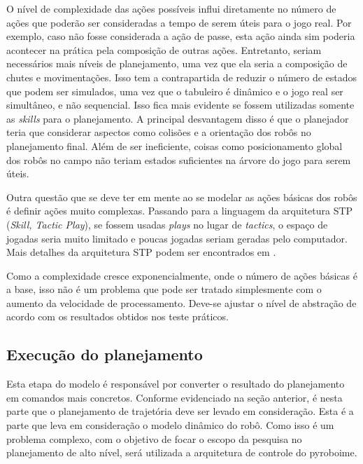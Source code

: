 O nível de complexidade das ações possíveis influi diretamente no número de
ações que poderão ser consideradas a tempo de serem úteis para o jogo real.  Por
exemplo, caso não fosse considerada a ação de passe, esta ação ainda sim poderia
acontecer na prática pela composição de outras ações.  Entretanto, seriam
necessários mais níveis de planejamento, uma vez que ela seria a composição de
chutes e movimentações.  Isso tem a contrapartida de reduzir o número de estados
que podem ser simulados, uma vez que o tabuleiro é dinâmico e o jogo real ser
simultâneo, e não sequencial.  Isso fica mais evidente se fossem utilizadas
somente as \textit{skills} para o planejamento.  A principal desvantagem disso é
que o planejador teria que considerar aspectos como colisões e a orientação dos
robôs no planejamento final.  Além de ser ineficiente, coisas como
posicionamento global dos robôs no campo não teriam estados suficientes na
árvore do jogo para serem úteis.

Outra questão que se deve ter em mente ao se modelar as ações básicas dos robôs
é definir ações muito complexas.  Passando para a linguagem da arquitetura STP
(\textit{Skill, Tactic Play}), se fossem usadas \textit{plays} no lugar de
\textit{tactics}, o espaço de jogadas seria muito limitado e poucas jogadas
seriam geradas pelo computador.  Mais detalhes da arquitetura STP podem ser
encontrados em \cite{browning2004stp}.

Como a complexidade cresce exponencialmente, onde o número de ações básicas é a
base, isso não é um problema que pode ser tratado simplesmente com o aumento da
velocidade de processamento.  Deve-se ajustar o nível de abstração de acordo com
os resultados obtidos nos teste práticos.

\subsection{Execução do planejamento}

Esta etapa do modelo é responsável por converter o resultado do planejamento em
comandos mais concretos.  Conforme evidenciado na seção anterior, é nesta parte
que o planejamento de trajetória deve ser levado em consideração.  Esta é a
parte que leva em consideração o modelo dinâmico do robô.  Como isso é um
problema complexo, com o objetivo de focar o escopo da pesquisa no planejamento
de alto nível, será utilizada a arquitetura de controle do pyroboime.


